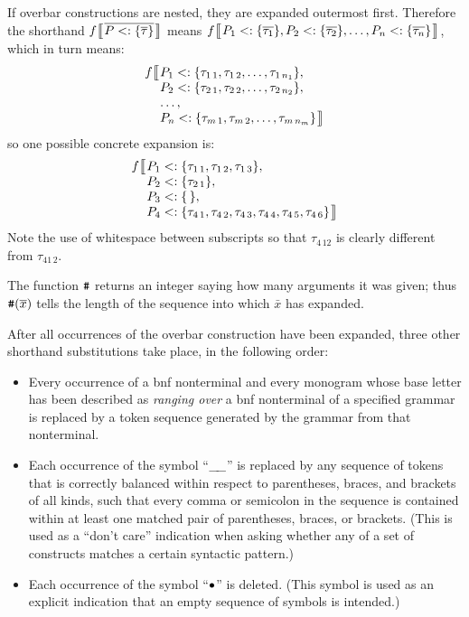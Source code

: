 If overbar constructions are nested, they are expanded outermost first.
Therefore the shorthand
$f\bigobb{P \extends \bdb{\tau}}$ means $f\bigob{P_1 \extends \bdb{\tau_1}, P_2 \extends \bdb{\tau_2}, \ldots, P_n \extends \bdb{\tau_n}}$, which in turn means:
\[ \begin{array}{l@{}l}
    f \big\llbracket \mskip0.5\thinmuskip & P_1 \extends \bd{\tau_{1\,1}, \tau_{1\,2}, \ldots, \tau_{1\,{n_1}}}, \\
                                          & P_2 \extends \bd{\tau_{2\,1}, \tau_{2\,2}, \ldots, \tau_{2\,{n_2}}}, \\
                                          & \ldots, \\
                                          & P_n \extends \bd{\tau_{m\,1}, \tau_{m\,2}, \ldots, \tau_{m\,{n_m}}} \mskip 0.5\thinmuskip \big\rrbracket
\end{array} \]
so one possible concrete expansion is:
\[ \begin{array}{l@{}l}
    f \big\llbracket \mskip0.5\thinmuskip & P_1 \extends \bd{\tau_{1\,1}, \tau_{1\,2}, \tau_{1\,3}}, \\
                                          & P_2 \extends \bd{\tau_{2\,1}}, \\
                                          & P_3 \extends \bd{\,}, \\
                                          & P_4 \extends \bd{\tau_{4\,1}, \tau_{4\,2}, \tau_{4\,3}, \tau_{4\,4}, \tau_{4\,5}, \tau_{4\,6}} \mskip 0.5\thinmuskip \big\rrbracket
\end{array} \]
Note the use of whitespace between subscripts so that $\tau_{4\,12}$ is clearly different from $\tau_{41\,2}$.

The function $\hbox{\tt\#}$ returns an integer saying how many arguments it was given; thus $\hbox{\tt\#}(\overline{x})$ tells the length of the sequence into which $\bar{x}$ has expanded.

After all occurrences of the overbar construction have been expanded, three other shorthand substitutions take place, in the following order:
\begin{itemize}
\item Every occurrence of a {\sc bnf} nonterminal and every monogram whose base letter has been described as \emph{ranging over} a {\sc bnf} nonterminal of a specified grammar is replaced by a token sequence generated by the grammar from that nonterminal.
\item Each occurrence of the symbol ``$\_\!\_$'' is replaced by any sequence of tokens that is correctly balanced within respect to parentheses, braces, and brackets of all kinds,
such that every comma or semicolon in the sequence is contained within at least one matched pair of parentheses, braces, or brackets. (This is used as a ``don't care'' indication when asking whether any of a set of constructs matches a certain syntactic pattern.)
\item Each occurrence of the symbol ``$\bullet$'' is deleted.  (This symbol is used as an explicit indication that an empty sequence of symbols is intended.)
\end{itemize}

